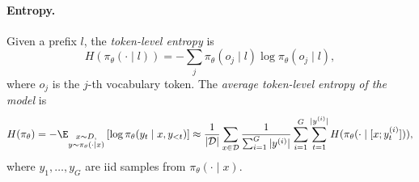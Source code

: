 \documentclass{article} %
\newcommand{\ych}[1]{\textcolor{purple}{[#1 -Chenghao]}}
\newcommand{\lin}[1]{\textcolor{blue}{[#1 -Lin]}}
\begin{document}
\paragraph{Entropy.} Given a prefix $l$, the \emph{token-level entropy} is 
\[
H(\pi_\theta(\cdot\mid l))=-\sum_{j}\pi_\theta(o_j\mid l)\log\pi_\theta(o_j\mid l),
\]
where $o_j$ is the $j$-th vocabulary token. The \emph{average token-level entropy of the model} is 
\[
H(\pi_\theta) 
= -\E_{\substack{x\sim D,\\y\sim\pi_\theta(\cdot\mid x)}}\left[\log\pi_\theta(y_t\mid x,y_{<t})\right]
\approx \frac{1}{|\mathcal{D}|}\sum_{x\in\mathcal{D}}\frac{1}{\sum_{i=1}^G|y^{(i)}|}\sum_{i=1}^G\sum_{t=1}^{|y^{(i)}|}H(\pi_\theta(\cdot\mid [x;y^{(i)}_t])),
\]
where $y_1,\dots,y_G$ are iid samples from $\pi_\theta(\cdot\mid x)$.




\end{document}
